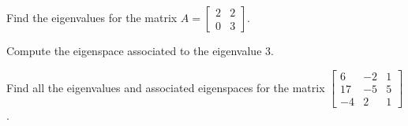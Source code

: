\begin{applicationActivities}{3}{27}
\begin{activity}{0}
Find the eigenvalues for the matrix $A = \begin{bmatrix} 2 & 2 \\ 0 & 3 \end{bmatrix}$.
\end{activity}

\begin{activity}{0}
  Compute the eigenspace associated to the eigenvalue $3$.
\end{activity}

\begin{activity}{0}
  Find all the eigenvalues and associated eigenspaces for the matrix $\begin{bmatrix} 6 & -2 & 1 \\ 17 & -5 & 5 \\ -4 & 2 & 1 \end{bmatrix}$.
\end{activity}

\end{applicationActivities}
